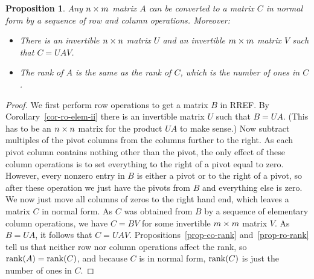 \documentclass[reqno]{amsart}
\newtheorem{proposition}[theorem]{Proposition}
\theoremstyle{definition}
\begin{document}
\begin{proposition}\label{prop-normal-form}
 Any $n\times m$ matrix $A$ can be converted to a matrix $C$ in normal
 form by a sequence of row and column operations.  Moreover:
 \begin{itemize}
  \item[(a)] There is an invertible $n\times n$ matrix $U$ and an invertible
   $m\times m$ matrix $V$ such that $C=UAV$.
  \item[(b)] The rank of $A$ is the same as the rank of $C$, which is
   the number of ones in $C$.
 \end{itemize}
\end{proposition}
\begin{proof}
 We first perform row operations to get a matrix $B$ in RREF.  By
 Corollary~\ref{cor-ro-elem-ii} there is an invertible matrix $U$ such
 that $B=UA$.  (This has to be an $n\times n$ matrix for the product $UA$
 to make sense.)  Now subtract multiples of the pivot columns from the
 columns further to the right.  As each pivot column contains nothing
 other than the pivot, the only effect of these column operations is
 to set everything to the right of a pivot equal to zero.  However,
 every nonzero entry in $B$ is either a pivot or to the right of a
 pivot, so after these operation we just have the pivots from $B$ and
 everything else is zero.  We now just move all columns of zeros to
 the right hand end, which leaves a matrix $C$ in normal form.  As $C$
 was obtained from $B$ by a sequence of elementary column operations,
 we have $C=BV$ for some invertible $m\times m$ matrix $V$.  As $B=UA$,
 it follows that $C=UAV$.  Propositions~\ref{prop-co-rank}
 and~\ref{prop-ro-rank} tell us that neither row nor column operations
 affect the rank, so $\operatorname{rank}(A)=\operatorname{rank}(C)$, and because $C$ is in normal
 form, $\operatorname{rank}(C)$ is just the number of ones in $C$.
\end{proof}
\end{document}
